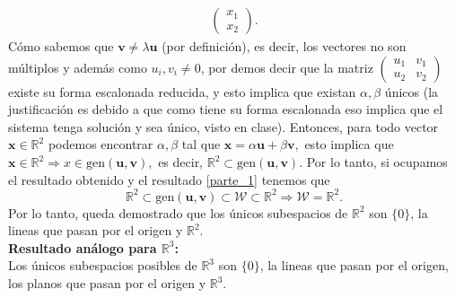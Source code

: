 \documentclass[11pt,letterpaper]{article}
\newcommand{\mR}{\mathbb{R}}
\newcommand{\gen}{\text{gen}}
\begin{document}
\begin{enumerate}
\begin{align*}
\begin{pmatrix}
x_1\\
x_2
\end{pmatrix}.
\end{align*}
Cómo sabemos que $\textbf{v}\neq\lambda\textbf{u}$ (por definición), es decir, los vectores no son múltiplos y además como $u_i, v_i\neq 0$, por demos decir que la matriz $\begin{pmatrix}
u_1&v_1\\
u_2&v_2
\end{pmatrix}$ existe su forma escalonada reducida, y esto implica que existan $\alpha, \beta$ únicos (la justificación es debido a que como tiene su forma escalonada eso implica que el sistema tenga solución y sea único, visto en clase). Entonces, para todo vector $\textbf{x}\in \mR^2$ podemos encontrar $\alpha, \beta$ tal que $\textbf{x}=\alpha\textbf{u}+\beta\textbf{v},$ esto implica que $\textbf{x}\in \mR^2\Rightarrow x \in \gen(\textbf{u},\textbf{v}),$ es decir, $\mR^2\subset \gen(\textbf{u},\textbf{v}).$ Por lo tanto, si ocupamos el resultado obtenido y el resultado \ref{parte_1} tenemos que 
$$\mR^2\subset \gen(\textbf{u},\textbf{v})\subset \mathcal{W} \subset\mR^2\Rightarrow \mathcal{W}=\mR^2.$$
Por lo tanto, queda demostrado que los únicos subespacios de $\mR^2$ son $\{0\}$, la lineas que pasan por el origen y $\mR^2$.\\

\textbf{Resultado análogo para $\mR^3$:}\\
Los únicos subespacios posibles de $\mR^3$ son $\{0\}$, la lineas que pasan por el origen, los planos que pasan por el origen y $\mR^3$.\\


\end{enumerate}
\end{document}
